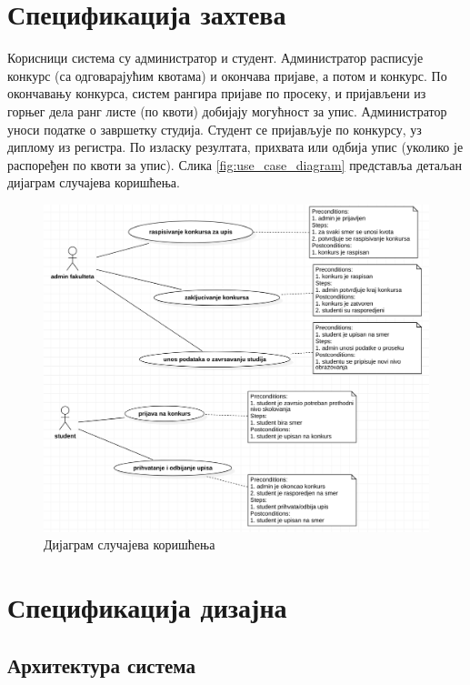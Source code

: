 \documentclass[a4paper]{article}
\begin{document}
\section*{Спецификација захтева}

Корисници система су администратор и студент. Администратор расписује конкурс (са одговарајућим квотама) и окончава пријаве,
а потом и конкурс. По окончавању конкурса, систем рангира пријаве по просеку, и пријављени из горњег дела ранг листе
(по квоти) добијају могућност за упис. Администратор уноси податке о завршетку студија. Студент се пријављује по конкурсу, уз диплому из регистра. По изласку резултата, прихвата или одбија упис (уколико је распоређен по квоти за упис). Слика \autoref{fig:use_case_diagram} представља детаљан дијаграм случајева коришћења.

\begin{figure}[H]
    \centering
    \includegraphics{images/use_case_diagram.png}
    \caption{Дијаграм случајева коришћења}
    \label{fig:use_case_diagram}
\end{figure}

\section*{Спецификација дизајна}

\subsection*{Архитектура система}
\end{document}
